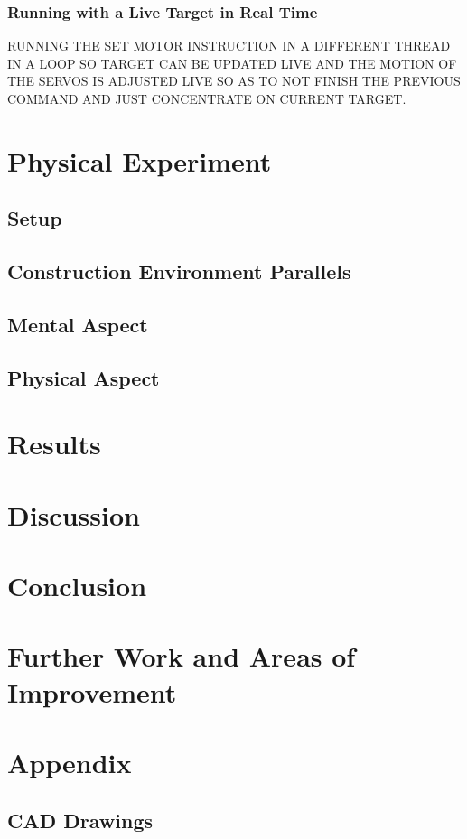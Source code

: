 \documentclass[11pt]{article}
\begin{document}
\subsubsection{Running with a Live Target in Real Time}
RUNNING THE SET MOTOR INSTRUCTION IN A DIFFERENT THREAD IN A LOOP SO TARGET CAN BE UPDATED LIVE AND THE MOTION OF THE SERVOS IS ADJUSTED LIVE SO AS TO NOT FINISH THE PREVIOUS COMMAND AND JUST CONCENTRATE ON CURRENT TARGET.

\section{Physical Experiment}
\subsection{Setup}
\subsection{Construction Environment Parallels}
\subsection{Mental Aspect}
\subsection{Physical Aspect}

\section{Results}

\section{Discussion}
\section{Conclusion}
\section{Further Work and Areas of Improvement}




\section{Appendix}
\subsection{CAD Drawings}
\end{document}
